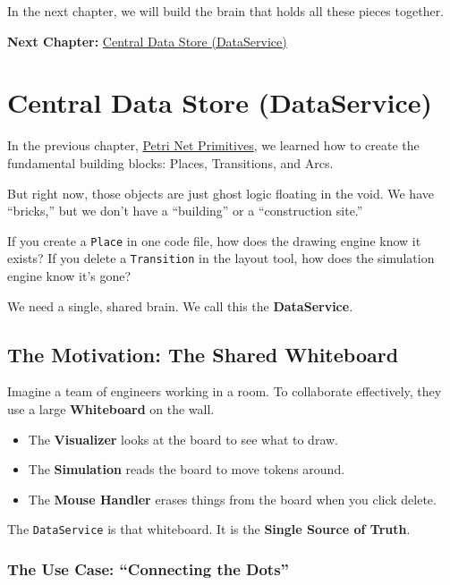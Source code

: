 \documentclass[a4paper,11pt,oneside]{report}
\begin{document}
In the next chapter, we will build the brain that holds all these pieces together.

\textbf{Next Chapter:} \hyperref[chap:dataservice]{Central Data Store (DataService)}


\chapter{Central Data Store (DataService)}
\label{chap:dataservice}

In the previous chapter, \hyperref[chap:primitives]{Petri Net Primitives}, we learned how to create the fundamental building blocks: Places, Transitions, and Arcs.

But right now, those objects are just ghost logic floating in the void. We have ``bricks,'' but we don't have a ``building'' or a ``construction site.''

If you create a \texttt{Place} in one code file, how does the drawing engine know it exists? If you delete a \texttt{Transition} in the layout tool, how does the simulation engine know it's gone?

We need a single, shared brain. We call this the \textbf{DataService}.

\section{The Motivation: The Shared Whiteboard}

Imagine a team of engineers working in a room. To collaborate effectively, they use a large \textbf{Whiteboard} on the wall.
\begin{itemize}
    \item The \textbf{Visualizer} looks at the board to see what to draw.
    \item The \textbf{Simulation} reads the board to move tokens around.
    \item The \textbf{Mouse Handler} erases things from the board when you click delete.
\end{itemize}

The \texttt{DataService} is that whiteboard. It is the \textbf{Single Source of Truth}.

\subsection{The Use Case: ``Connecting the Dots''}
\end{document}
